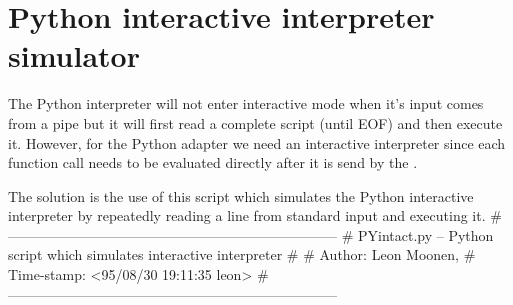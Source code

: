 
\section{\label{PYintact}Python interactive interpreter simulator}

The Python interpreter will not enter interactive mode when it's input
comes from a pipe but it will first read a complete script (until EOF)
and then execute it.  However, for the Python adapter we need an
interactive interpreter since each function call needs to be evaluated
directly after it is send by the \TB.

The solution is the use of this script which simulates the Python
interactive interpreter by repeatedly reading a line from standard
input and executing it.
\endmoddef\let\nwnotused=\nwoutput{}\nwstartdeflinemarkup{}\nwenddeflinemarkup
# -----------------------------------------------------------------------
# PYintact.py -- Python script which simulates interactive interpreter
#
# Author:       Leon Moonen,
# Time-stamp:   <95/08/30 19:11:35 leon>
# -----------------------------------------------------------------------

